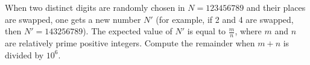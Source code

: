 When two distinct digits are randomly chosen in $N=123456789$ and their places are swapped, one gets a new number $N'$ (for example, if 2 and 4 are swapped, then $N'=143256789$). The expected value of $N'$ is equal to $\frac{m}{n}$, where $m$ and $n$ are relatively prime positive integers. Compute the remainder when $m+n$ is divided by $10^6$.
